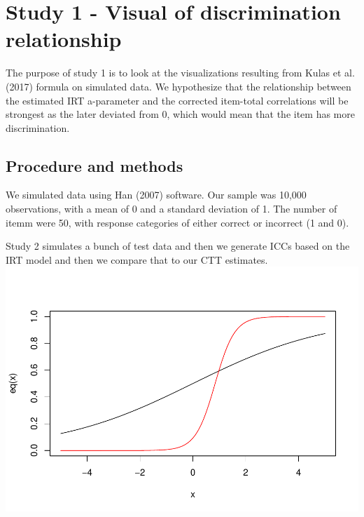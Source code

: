 \documentclass[
  english,
  man,floatsintext]{apa6}
\begin{document}
\hypertarget{study-1---visual-of-discrimination-relationship}{%
\section{Study 1 - Visual of discrimination relationship}\label{study-1---visual-of-discrimination-relationship}}

The purpose of study 1 is to look at the visualizations resulting from Kulas et al. (2017) formula on simulated data. We hypothesize that the relationship between the estimated IRT a-parameter and the corrected item-total correlations will be strongest as the later deviated from 0, which would mean that the item has more discrimination.

\hypertarget{procedure-and-methods}{%
\subsection{Procedure and methods}\label{procedure-and-methods}}

We simulated data using Han (2007) software. Our sample was 10,000 observations, with a mean of 0 and a standard deviation of 1. The number of itemm were 50, with response categories of either correct or incorrect (1 and 0).

Study 2 simulates a bunch of test data and then we generate ICCs based on the IRT model and then we compare that to our CTT estimates.\\

\includegraphics{ICC_project_files/figure-latex/unnamed-chunk-2-1.pdf}
\end{document}
